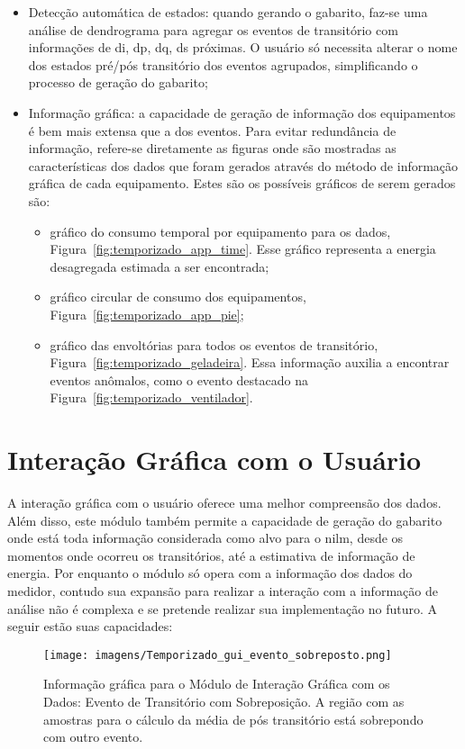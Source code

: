 \begin{itemize}
\item Detecção automática de estados: quando gerando o gabarito,
faz-se uma análise de dendrograma para agregar os eventos de
transitório com informações de \acs{di}, \acs{dp}, \acs{dq}, \acs{ds}
próximas. O usuário só necessita alterar o nome dos estados pré/pós
transitório dos eventos agrupados, simplificando o processo de geração
do gabarito;
\item Informação gráfica: a capacidade de geração de informação dos
equipamentos é bem mais extensa que a dos eventos. Para evitar
redundância de informação, refere-se diretamente as figuras onde são
mostradas as características dos dados que foram gerados através do
método de informação gráfica de cada equipamento. Estes são os possíveis 
gráficos de serem gerados são:
\begin{itemize}
\item gráfico do consumo temporal por equipamento para os dados,
Figura~\ref{fig:temporizado_app_time}. Esse gráfico representa a
energia desagregada estimada a ser encontrada;
\item gráfico circular de consumo dos equipamentos,
Figura~\ref{fig:temporizado_app_pie};
\item gráfico das envoltórias para todos os eventos de transitório,
Figura~\ref{fig:temporizado_geladeira}. Essa informação auxilia a
encontrar eventos anômalos, como o evento destacado na
Figura~\ref{fig:temporizado_ventilador}.
\end{itemize}
\end{itemize}

\section{Interação Gráfica com o Usuário}
\label{sec:gui}

A interação gráfica com o usuário oferece uma melhor compreensão dos
dados. Além disso, este módulo também permite a capacidade de geração
do gabarito onde está toda informação considerada como alvo para o
\gls{nilm}, desde os momentos onde ocorreu os transitórios, até a
estimativa de informação de energia. Por enquanto o módulo só opera
com a informação dos dados do medidor, contudo sua expansão para
realizar a interação com a informação de análise não é complexa e
se pretende realizar sua implementação no futuro. A seguir estão
suas capacidades:

\begin{sidewaysfigure}[p]
\centering
\texttt{[image: imagens/Temporizado\_gui\_evento\_sobreposto.png]}
\caption[Informação gráfica para o Módulo de Interação Gráfica com os
Dados: Evento de Transitório com Sobreposição.]{Informação gráfica
para o Módulo de Interação Gráfica com os Dados: Evento de Transitório com
Sobreposição. A região com as amostras para o cálculo da média de pós
transitório está sobrepondo com outro evento.}
\label{fig:gui_evento_sobreposto}
\end{sidewaysfigure}

